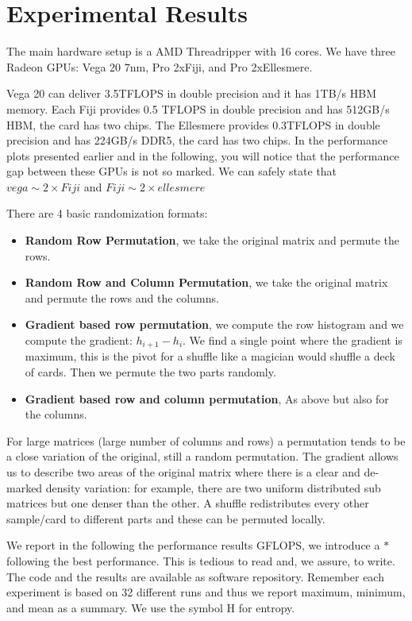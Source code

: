 \documentclass[manuscript,screen]{acmart}
\begin{document}
\section{Experimental Results}
\label{sec:experimentalresults}
The main hardware setup is a AMD Threadripper with 16 cores. We have
three Radeon GPUs: Vega 20 7nm, Pro 2xFiji, and Pro 2xEllesmere.

Vega 20 can deliver 3.5TFLOPS in double precision and it has 1TB/s HBM
memory. Each Fiji provides 0.5 TFLOPS in double precision and has
512GB/s HBM, the card has two chips.  The Ellesmere provides 0.3TFLOPS
in double precision and has 224GB/s DDR5, the card has two chips. In
the performance plots presented earlier and in the following, you will
notice that the performance gap between these GPUs is not so
marked. We can safely state that $vega \sim 2\times Fiji$ and $Fiji \sim
2\times ellesmere$



There are 4 basic randomization formats:
\begin{itemize}
  \item {\bf Random Row Permutation}, we take the original matrix and
    permute the rows.
  \item {\bf Random Row and Column Permutation}, we take the original
    matrix and permute the rows and the columns.
  \item {\bf Gradient based row permutation}, we compute the row
    histogram and we compute the gradient: $h_{i+1} - h_i$. We find a
    single point where the gradient is maximum, this is the pivot for
    a shuffle like a magician would shuffle a deck of cards.  Then we
    permute the two parts randomly.
  \item {\bf Gradient based row and column permutation}, As above but
    also for the columns.
\end{itemize}

For large matrices (large number of columns and rows) a permutation
tends to be a close variation of the original, still a random
permutation. The gradient allows us to describe two areas of the
original matrix where there is a clear and de-marked density
variation: for example, there are two uniform distributed sub matrices
but one denser than the other. A shuffle redistributes every other
sample/card to different parts and these can be permuted locally.


    
We report in the following the performance results GFLOPS, we
introduce a $\boldsymbol *$ following the best performance. This is
tedious to read and, we assure, to write. The code and the results are
available as software repository. Remember each experiment is based on
32 different runs and thus we report maximum, minimum, and mean as a
summary. We use the symbol H for entropy.    



%

 

%
\end{document}
